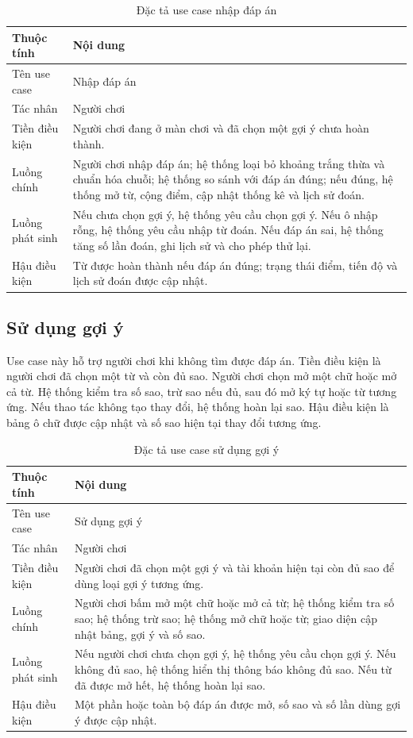 ﻿\documentclass[../DoAn.tex]{subfiles}
\begin{document}
\begin{table}[H]
\centering
\begin{tabular}{|p{3.2cm}|p{10.8cm}|}
\hline
\textbf{Thuộc tính} & \textbf{Nội dung} \\ \hline
Tên use case & Nhập đáp án \\ \hline
Tác nhân & Người chơi \\ \hline
Tiền điều kiện & Người chơi đang ở màn chơi và đã chọn một gợi ý chưa hoàn thành. \\ \hline
Luồng chính & Người chơi nhập đáp án; hệ thống loại bỏ khoảng trắng thừa và chuẩn hóa chuỗi; hệ thống so sánh với đáp án đúng; nếu đúng, hệ thống mở từ, cộng điểm, cập nhật thống kê và lịch sử đoán. \\ \hline
Luồng phát sinh & Nếu chưa chọn gợi ý, hệ thống yêu cầu chọn gợi ý. Nếu ô nhập rỗng, hệ thống yêu cầu nhập từ đoán. Nếu đáp án sai, hệ thống tăng số lần đoán, ghi lịch sử và cho phép thử lại. \\ \hline
Hậu điều kiện & Từ được hoàn thành nếu đáp án đúng; trạng thái điểm, tiến độ và lịch sử đoán được cập nhật. \\ \hline
\end{tabular}
\caption{Đặc tả use case nhập đáp án}
\label{table:uc_guess}
\end{table}

\subsection{Sử dụng gợi ý}
Use case này hỗ trợ người chơi khi không tìm được đáp án. Tiền điều kiện là người chơi đã chọn một từ và còn đủ sao. Người chơi chọn mở một chữ hoặc mở cả từ. Hệ thống kiểm tra số sao, trừ sao nếu đủ, sau đó mở ký tự hoặc từ tương ứng. Nếu thao tác không tạo thay đổi, hệ thống hoàn lại sao. Hậu điều kiện là bảng ô chữ được cập nhật và số sao hiện tại thay đổi tương ứng.

\begin{table}[H]
\centering
\begin{tabular}{|p{3.2cm}|p{10.8cm}|}
\hline
\textbf{Thuộc tính} & \textbf{Nội dung} \\ \hline
Tên use case & Sử dụng gợi ý \\ \hline
Tác nhân & Người chơi \\ \hline
Tiền điều kiện & Người chơi đã chọn một gợi ý và tài khoản hiện tại còn đủ sao để dùng loại gợi ý tương ứng. \\ \hline
Luồng chính & Người chơi bấm mở một chữ hoặc mở cả từ; hệ thống kiểm tra số sao; hệ thống trừ sao; hệ thống mở chữ hoặc từ; giao diện cập nhật bảng, gợi ý và số sao. \\ \hline
Luồng phát sinh & Nếu người chơi chưa chọn gợi ý, hệ thống yêu cầu chọn gợi ý. Nếu không đủ sao, hệ thống hiển thị thông báo không đủ sao. Nếu từ đã được mở hết, hệ thống hoàn lại sao. \\ \hline
Hậu điều kiện & Một phần hoặc toàn bộ đáp án được mở, số sao và số lần dùng gợi ý được cập nhật. \\ \hline
\end{tabular}
\caption{Đặc tả use case sử dụng gợi ý}
\label{table:uc_hint}
\end{table}
\end{document}
